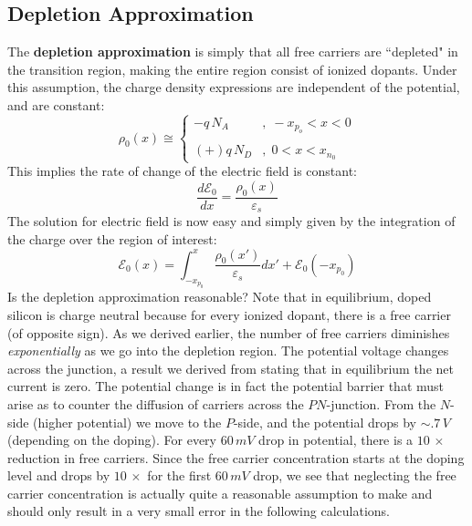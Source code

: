\subsection{Depletion Approximation}
The \textbf{depletion approximation} is simply that all free carriers are ``depleted" in the transition region, making the entire region consist of ionized dopants.  Under this assumption, the charge density expressions are independent of the potential, and are constant:
    \begin{equation}
        \rho _0(x) \cong
            \begin{cases} 
                -q\,N_A &,\; -x_{p_o} < x < 0 \\ \\
                (+)q\,N_D &,\; 0 < x < x_{n_0}
            \end{cases}
    \end{equation}
This implies the rate of change of the electric field is constant:
    \begin{equation} 
        \frac{{d{\mathcal{E}_0}}}{{dx}} = \frac{{{\rho _0}(x)}}{{{\varepsilon _s}}}
    \end{equation}
The solution for electric field is now easy and simply given by the integration of the charge over the region of interest:
    \begin{equation}
        \mathcal{E}_0(x) = \int_{-x_{p_0}}^x \frac{\rho _0(x')}{\varepsilon_s}dx' + \mathcal{E}_0(-x_{p_0}) 
    \end{equation}
Is the depletion approximation reasonable?  Note that in equilibrium, doped silicon is charge neutral because for every ionized dopant, there is a free carrier (of opposite sign).  As we derived earlier, the number of free carriers diminishes \textit{exponentially} as we go into the depletion region.  The potential voltage changes across the junction, a result we derived from stating that in equilibrium the net  current is zero.  The potential change is in fact the potential barrier that must arise as to counter the diffusion of carriers across the $PN$-junction.   From the $N$-side (higher potential) we move to the $P$-side, and the potential drops by $\sim.7\,V$ (depending on the doping).  For every $60\,mV$ drop in potential, there is a $10\,\times$ reduction in free carriers.  Since the free carrier concentration starts at the doping level and drops by $10\,\times$ for the first $60\,mV$ drop, we see that neglecting the free carrier concentration is actually quite a reasonable assumption to make and should only result in a very small error in the following calculations.

